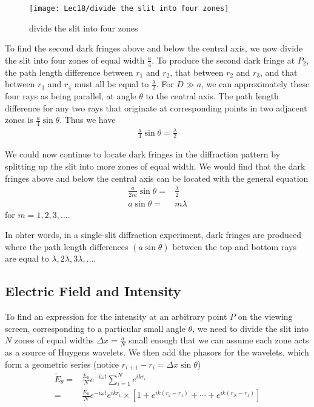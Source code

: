 \begin{figure}[H]
    \centering
    \texttt{[image: Lec18/divide the slit into four zones]}
    \caption{divide the slit into four zones}
\end{figure}

To find the second dark fringes above and below the central axis, we now divide the slit into four zones of equal width $\frac{a}{4}$. To produce the second dark fringe at $P_2$, the path length difference between $r_1$ and $r_2$, that between $r_2$ and $r_3$, and that between $r_3$ and $r_4$ must all be equal to $\frac{\lambda}{2}$. For $D \gg a$, we can approximately these four rays as being parallel, at angle $\theta$ to the central axis. The path length difference for any two rays that originate at corresponding points in two adjacent zones is $\frac{a}{4}\sin\theta$. Thus we have
\begin{align*}
    \frac{a}{4}\sin\theta=\frac{\lambda}{2}
\end{align*}

We could now continue to locate dark fringes in the diffraction pattern by splitting up the slit into more zones of equal width. We would find that the dark fringes above and below the central axis can be located with the general equation
\begin{align*}
    \frac{a}{2m}\sin\theta=&\frac{\lambda}{2}\\
    a\sin\theta=&m\lambda
\end{align*}
for $m=1,2,3,\dots$. 

In ohter words, in a single-slit diffraction experiment, dark fringes are produced where the path length differences $(a\sin\theta)$ between the top and bottom rays are equal to $\lambda, 2\lambda,3\lambda,\dots$. 

\subsection{Electric Field and Intensity}
To find an expression for the intensity at an arbitrary point $P$ on the viewing screen, corresponding to a particular small angle $\theta$, we need to divide the slit into $N$ zones of equal widths $\Delta x=\frac{a}{N}$ small enough that we can assume each zone acts as a source of Huygens wavelets. We then add the phasors for the wavelets, which form a geometric series (notice $r_{i+1}-r_i=\Delta x\sin\theta$)
\begin{align*}
    \tilde{E}_{\theta}=&\frac{E_0}{N} e^{-i\omega t} \sum_{i=1}^N e^{ikr_i}\\
    =&\frac{E_0}{N}e^{-i\omega t}e^{ikr_1}\times \left[ 1+ e^{ik(r_2-r_1)}+\cdots+e^{ik(r_N-r_1)} \right]
\end{align*}

